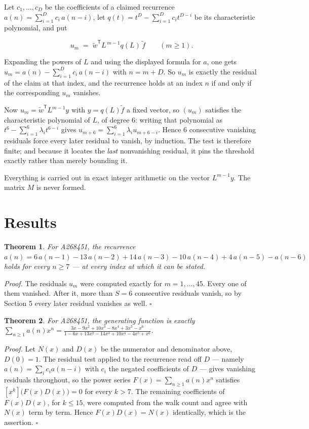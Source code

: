 \documentclass[11pt]{article}
\newtheorem{theorem}{Theorem}
\theoremstyle{definition}
\begin{document}
Let $c_1,\dots,c_D$ be the coefficients of a claimed recurrence $a(n) = \sum_{i=1}^{D} c_i\,a(n-i)$, let $q(t) = t^{D} - \sum_{i=1}^{D} c_i t^{D-i}$ be its characteristic polynomial, and put

\[u_m \;=\; \tilde w^{\mathsf T} L^{\,m-1} q(L)\,\tilde f \qquad (m \ge 1).\]

Expanding the powers of $L$ and using the displayed formula for $a$, one gets $u_m = a(n) - \sum_{i=1}^{D} c_i\,a(n-i)$ with $n = m + D$. So $u_m$ is exactly the residual of the claim at that index, and the recurrence holds at an index $n$ if and only if the corresponding $u_m$ vanishes.

Now $u_m = \tilde w^{\mathsf T} L^{m-1} y$ with $y = q(L)\tilde f$ a fixed vector, so $(u_m)$ satisfies the characteristic polynomial of $L$, of degree $6$: writing that polynomial as $t^{6} - \sum_{i=1}^{6} \lambda_i t^{6-i}$ gives $u_{m+6} = \sum_{i=1}^{6} \lambda_i u_{m+6-i}$. Hence $6$ consecutive vanishing residuals force every later residual to vanish, by induction. The test is therefore finite; and because it locates the {\itshape last} nonvanishing residual, it pins the threshold exactly rather than merely bounding it.

Everything is carried out in exact integer arithmetic on the vector $L^{m-1}y$. The matrix $M$ is never formed.

\section{Results}

\begin{theorem} For A268451, the recurrence $a(n) = 6\,a(n-1) - 13\,a(n-2) + 14\,a(n-3) - 10\,a(n-4) + 4\,a(n-5) - a(n-6)$ holds for every $n \ge 7$ --- at every index at which it can be stated.\end{theorem}

{\itshape Proof.} The residuals $u_m$ were computed exactly for $m = 1,\dots,45$. Every one of them vanished. After it, more than $S = 6$ consecutive residuals vanish, so by Section 5 every later residual vanishes as well. $\square$

\begin{theorem} For A268451, the generating function is exactly $\sum_{n\ge 1} a(n)x^n = \frac{3x - 9x^{2} + 10x^{3} - 8x^{4} + 3x^{5} - x^{6}}{1 - 6x + 13x^{2} - 14x^{3} + 10x^{4} - 4x^{5} + x^{6}}$.\end{theorem}

{\itshape Proof.} Let $N(x)$ and $D(x)$ be the numerator and denominator above, $D(0)=1$. The residual test applied to the recurrence read off $D$ --- namely $a(n) = \sum_i c_i a(n-i)$ with $c_i$ the negated coefficients of $D$ --- gives vanishing residuals throughout, so the power series $F(x)=\sum_{n\ge 1}a(n)x^n$ satisfies $[x^k]\bigl(F(x)D(x)\bigr) = 0$ for every $k > 7$. The remaining coefficients of $F(x)D(x)$, for $k \le 15$, were computed from the walk count and agree with $N(x)$ term by term. Hence $F(x)D(x) = N(x)$ identically, which is the assertion. $\square$
\end{document}
